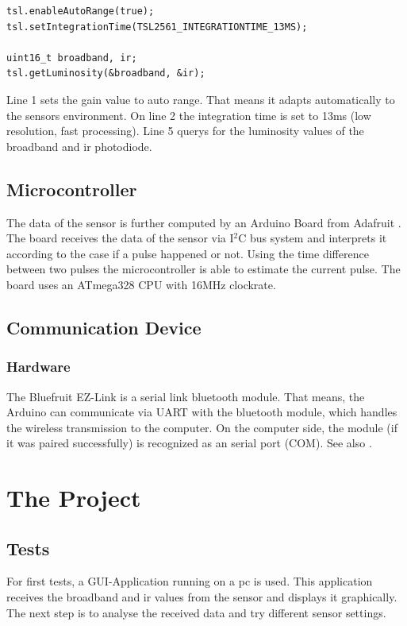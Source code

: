 \documentclass[fontsize=12pt,toc=bibliography, notitlepage]{scrreprt}
\begin{document}
\begin{lstlisting}
tsl.enableAutoRange(true);
tsl.setIntegrationTime(TSL2561_INTEGRATIONTIME_13MS);

uint16_t broadband, ir;
tsl.getLuminosity(&broadband, &ir);
\end{lstlisting}

Line 1 sets the gain value to auto range. That means it adapts automatically to the sensors environment. On line 2 the integration time is set to 13ms (low resolution, fast processing). Line 5 querys for the luminosity values of the broadband and ir photodiode.

\section{Microcontroller}
\label{sec:microcontroller}
The data of the sensor is further computed by an Arduino Board from Adafruit \cite{bib:arduino-board}. The board receives the data of the sensor via I$^{2}$C bus system and interprets it according to the case if a pulse happened or not. Using the time difference between two pulses the microcontroller is able to estimate the current pulse.
The board uses an ATmega328 CPU with 16MHz clockrate.

\section{Communication Device}
\label{sec:communication-device}

\subsection{Hardware}
\label{subsec:bluetooth-adapter-hardware}
The Bluefruit EZ-Link is a serial link bluetooth module. That means, the Arduino can communicate via UART with the bluetooth module, which handles the wireless transmission to the computer. On the computer side, the module (if it was paired successfully) is recognized as an serial port (COM). See also \cite{bib:bluetooth-adapter}.

\chapter{The Project}
\label{chap:the-project}

\section{Tests}
\label{sec:tests}
For first tests, a GUI-Application running on a pc is used. This application receives the broadband and ir values from the sensor and displays it graphically.
The next step is to analyse the received data and try different sensor settings.
\end{document}

